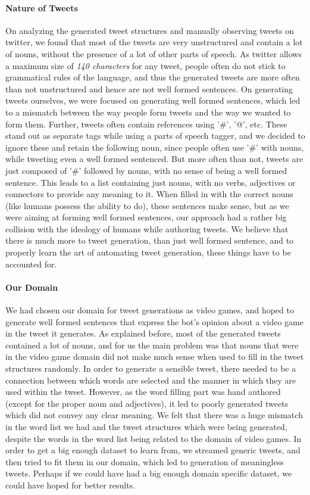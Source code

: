 \paragraph{Nature of Tweets}
On analyzing the generated tweet structures and manually observing tweets on twitter, we found that most of the tweets are very unstructured and contain a lot of nouns, without the presence of a lot of other parts of speech. As twitter allows a maximum size of \textit{140 characters} for any tweet, people often do not stick to grammatical rules of the language, and thus the generated tweets are more often than not unstructured and hence are not well formed sentences. On generating tweets ourselves, we were focused on generating well formed sentences, which led to a mismatch between the way people form tweets and the way we wanted to form them. Further, tweets often contain references using '\#', '@', etc. These stand out as separate tags while using a parts of speech tagger, and we decided to ignore these and retain the following noun, since people often use '\#' with nouns, while tweeting even a well formed sentenced. But more often than not, tweets are just composed of '\#' followed by nouns, with no sense of being a well formed sentence. This leads to a list containing just nouns, with no verbs, adjectives or connectors to provide any meaning to it. When filled in with the correct nouns (like humans possess the ability to do), these sentences make sense, but as we were aiming at forming well formed sentences, our approach had a rather big collision with the ideology of humans while authoring tweets. We believe that there is much more to tweet generation, than just well formed sentence, and to properly learn the art of automating tweet generation, these things have to be accounted for.

\paragraph{Our Domain}
We had chosen our domain for tweet generations as video games, and hoped to generate well formed sentences that express the bot's opinion about a video game in the tweet it generates. As explained before, most of the generated tweets contained a lot of nouns, and for us the main problem was that nouns that were in the video game domain did not make much sense when used to fill in the tweet structures randomly. In order to generate a sensible tweet, there needed to be a connection between which words are selected and the manner in which they are used within the tweet. However, as the word filling part was hand authored (except for the proper noun and adjectives), it led to poorly generated tweets which did not convey any clear meaning. We felt that there was a huge mismatch in the word list we had and the tweet structures which were being generated, despite the words in the word list being related to the domain of video games. In order to get a big enough dataset to learn from, we streamed generic tweets, and then tried to fit them in our domain, which led to generation of meaningless tweets. Perhaps if we could have had a big enough domain specific dataset, we could have hoped for better results.

